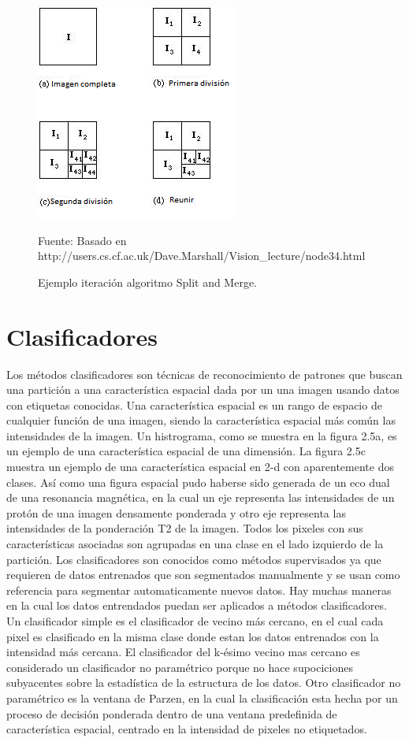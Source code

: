 \documentclass[12pt]{report}
\begin{document}
\begin{enumerate}[A.]
\begin{figure}[H]
\centering
\includegraphics[width = 7 cm, height = 7 cm]{split}
\caption{Ejemplo iteración algoritmo Split and Merge.}
Fuente: Basado en http://users.cs.cf.ac.uk/Dave.Marshall/Vision_lecture/node34.html
\end{figure}
\end{enumerate}

\section{Clasificadores}
Los métodos clasificadores son técnicas de reconocimiento de patrones que buscan una partición a una característica espacial dada por un una imagen usando datos con etiquetas conocidas.
Una característica espacial es un rango de espacio de cualquier función de una imagen, siendo la característica espacial más común las intensidades de la imagen. Un histrograma, como se muestra en la figura 2.5a, es un ejemplo de una característica espacial de una dimensión. La figura 2.5c muestra un ejemplo de una característica espacial en 2-d con aparentemente dos clases.
Así como una figura espacial pudo haberse sido generada de un eco dual de una resonancia magnética, en la cual un eje representa las intensidades de un protón de una imagen densamente ponderada y otro eje representa las intensidades de la ponderación T2 de la imagen.
Todos los pixeles con sus características asociadas son agrupadas en una clase en el lado izquierdo de la partición.
Los clasificadores son conocidos como métodos supervisados ya que requieren de datos entrenados que son segmentados manualmente y se usan como referencia para segmentar automaticamente nuevos datos.
Hay muchas maneras en la cual los datos entrendados puedan ser aplicados a métodos clasificadores. Un clasificador simple es el clasificador de vecino más cercano, en el cual cada pixel es clasificado en la misma clase donde estan los datos entrenados con la intensidad más cercana. El clasificador del k-ésimo vecino mas cercano es
considerado un clasificador no paramétrico porque no hace supociciones subyacentes sobre la estadística de la estructura de los datos.
Otro clasificador no paramétrico es la ventana de Parzen, en  la cual la clasificación esta hecha por un proceso de decisión ponderada dentro de una ventana predefinida de característica espacial, centrado en la intensidad de pixeles no etiquetados.\\
\end{document}

